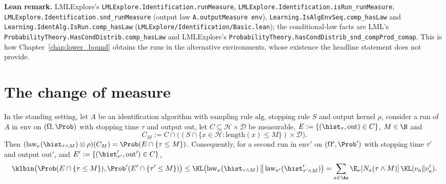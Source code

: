 \textbf{Lean remark.} LMLExplore's \texttt{LMLExplore.Identification.runMeasure},
\texttt{LMLExplore.Identification.isRun\_runMeasure}, \texttt{LMLExplore.Identification.snd\_runMeasure}
(output law \texttt{A.outputMeasure env}), \texttt{Learning.IsAlgEnvSeq.comp\_hasLaw} and
\texttt{Learning.IdentAlg.IsRun.comp\_hasLaw} (\texttt{LMLExplore/Identification/Basic.lean});
the conditional-law facts are LML's \texttt{ProbabilityTheory.HasCondDistrib.comp\_hasLaw} and
LMLExplore's \texttt{ProbabilityTheory.hasCondDistrib\_snd\_compProd\_comap}. This is how
Chapter~\ref{chap:lower_bound} obtains the runs in the alternative environments, whose
existence the headline statement does not provide.

\section{The change of measure}
\label{sec:pinfo_change_of_measure}

\begin{lemma}\label{lem:pinfo_truncated_pair}
\leanok
{}
In the standing setting, let $A$ be an identification algorithm with sampling rule
$\mathrm{alg}$, stopping rule $S$ and output kernel $\rho$, consider a run of $A$ in
$\mathrm{env}$ on $(\Omega,\Prob)$ with stopping time $\tau$ and output $\mathrm{out}$, let
$C \subseteq \mathcal H\times\mathcal D$ be measurable, $E := \{(\hist_\tau, \mathrm{out}) \in C\}$,
$M \in \N$ and
\[
  C_M := C \cap \big((S \cap \{x \in \mathcal H : \mathrm{length}(x) \le M\}) \times \mathcal D\big).
\]
Then $(\mathrm{law}_\nu(\hist_{\tau\wedge M}) \otimes \rho)(C_M) = \Prob(E \cap \{\tau \le M\})$.
Consequently, for a second run in $\mathrm{env}'$ on $(\Omega', \Prob')$ with stopping time $\tau'$
and output $\mathrm{out}'$, and $E' := \{(\hist'_{\tau'}, \mathrm{out}') \in C\}$,
\[
  \klbin\big(\Prob(E \cap \{\tau \le M\}), \Prob'(E' \cap \{\tau' \le M\})\big)
  \le \KL\big(\mathrm{law}_\nu(\hist_{\tau\wedge M})\,\big\|\,\mathrm{law}_{\nu'}(\hist'_{\tau'\wedge M})\big)
  = \sum_{a\in\As}\E_\nu[N_a(\tau\wedge M)]\,\KL(\nu_a\|\nu'_a) .
\]
\end{lemma}


